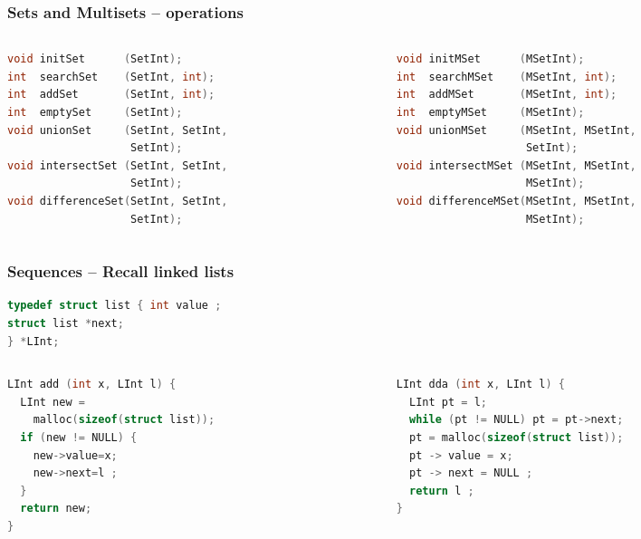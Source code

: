 \documentclass[aspectratio=169]{beamer}
\begin{document}
\begin{frame}[fragile]\frametitle{Sets and Multisets -- operations}
\centering

\begin{columns}
\begin{column}{.48\textwidth}
\begin{lstlisting}[language=C++,emph={MSetInt,SetInt}]
void initSet      (SetInt);
int  searchSet    (SetInt, int);
int  addSet       (SetInt, int);
int  emptySet     (SetInt);
void unionSet     (SetInt, SetInt,
                   SetInt);
void intersectSet (SetInt, SetInt,
                   SetInt);
void differenceSet(SetInt, SetInt,
                   SetInt);
\end{lstlisting}
%
\end{column}
\begin{column}{.50\textwidth}
%
\begin{lstlisting}[language=C++,emph={MSetInt,SetInt}]
void initMSet      (MSetInt); 
int  searchMSet    (MSetInt, int);
int  addMSet       (MSetInt, int);
int  emptyMSet     (MSetInt);
void unionMSet     (MSetInt, MSetInt,
                    SetInt);
void intersectMSet (MSetInt, MSetInt,
                    MSetInt); 
void differenceMSet(MSetInt, MSetInt,
                    MSetInt);
\end{lstlisting}
%
\end{column}
\end{columns}

\end{frame}

\begin{frame}[fragile]\frametitle{Sequences -- Recall linked lists}
  
\begin{lstlisting}[language=C++,emph={list,LInt}]
typedef struct list { int value ;
struct list *next;
} *LInt;
\end{lstlisting}

\begin{columns}
\begin{column}{.48\textwidth}
\begin{lstlisting}[language=C, emph={prev,LInt},morekeywords={malloc}]
LInt add (int x, LInt l) {
  LInt new =
    malloc(sizeof(struct list));
  if (new != NULL) {
    new->value=x;
    new->next=l ;
  }
  return new;
}
\end{lstlisting}
%
\end{column}
\begin{column}{.50\textwidth}
%
\begin{lstlisting}[language=C, emph={prev,LInt},morekeywords={malloc}]
LInt dda (int x, LInt l) {
  LInt pt = l;
  while (pt != NULL) pt = pt->next;
  pt = malloc(sizeof(struct list));
  pt -> value = x;
  pt -> next = NULL ;
  return l ;
}
\end{lstlisting}
%
\end{column}
\end{columns}
\end{frame}
\end{document}
